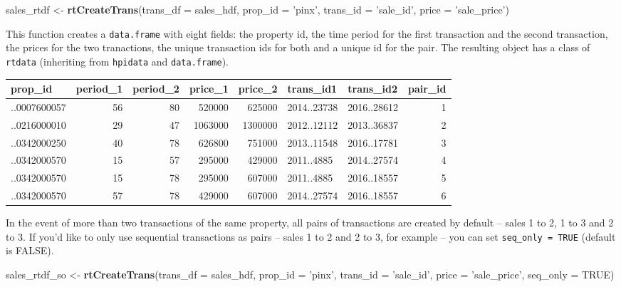 \documentclass[]{article}
\newenvironment{Shaded}{\begin{snugshade}}{\end{snugshade}}
\newcommand{\KeywordTok}[1]{\textcolor[rgb]{0.13,0.29,0.53}{\textbf{#1}}}
\newcommand{\DataTypeTok}[1]{\textcolor[rgb]{0.13,0.29,0.53}{#1}}
\newcommand{\StringTok}[1]{\textcolor[rgb]{0.31,0.60,0.02}{#1}}
\newcommand{\OtherTok}[1]{\textcolor[rgb]{0.56,0.35,0.01}{#1}}
\newcommand{\NormalTok}[1]{#1}
\begin{document}
\begin{Shaded}
\begin{Highlighting}[]
\NormalTok{  sales_rtdf <-}\StringTok{ }\KeywordTok{rtCreateTrans}\NormalTok{(}\DataTypeTok{trans_df =}\NormalTok{ sales_hdf,}
                              \DataTypeTok{prop_id =} \StringTok{'pinx'}\NormalTok{,}
                              \DataTypeTok{trans_id =} \StringTok{'sale_id'}\NormalTok{,}
                              \DataTypeTok{price =} \StringTok{'sale_price'}\NormalTok{)}
                          
\end{Highlighting}
\end{Shaded}

This function creates a \texttt{data.frame} with eight fields: the
property id, the time period for the first transaction and the second
transaction, the prices for the two tranactions, the unique transaction
ids for both and a unique id for the pair. The resulting object has a
class of \texttt{rtdata} (inheriting from \texttt{hpidata} and
\texttt{data.frame}).

\begin{longtable}[]{@{}lrrrrllr@{}}
\toprule
prop\_id & period\_1 & period\_2 & price\_1 & price\_2 & trans\_id1 &
trans\_id2 & pair\_id\tabularnewline
\midrule
\endhead
..0007600057 & 56 & 80 & 520000 & 625000 & 2014..23738 & 2016..28612 &
1\tabularnewline
..0216000010 & 29 & 47 & 1063000 & 1300000 & 2012..12112 & 2013..36837 &
2\tabularnewline
..0342000250 & 40 & 78 & 626800 & 751000 & 2013..11548 & 2016..17781 &
3\tabularnewline
..0342000570 & 15 & 57 & 295000 & 429000 & 2011..4885 & 2014..27574 &
4\tabularnewline
..0342000570 & 15 & 78 & 295000 & 607000 & 2011..4885 & 2016..18557 &
5\tabularnewline
..0342000570 & 57 & 78 & 429000 & 607000 & 2014..27574 & 2016..18557 &
6\tabularnewline
\bottomrule
\end{longtable}

In the event of more than two transactions of the same property, all
pairs of transactions are created by default -- sales 1 to 2, 1 to 3 and
2 to 3. If you'd like to only use sequential transactions as pairs --
sales 1 to 2 and 2 to 3, for example -- you can set
\texttt{seq\_only\ =\ TRUE} (default is FALSE).

\begin{Shaded}
\begin{Highlighting}[]
\NormalTok{  sales_rtdf_so <-}\StringTok{ }\KeywordTok{rtCreateTrans}\NormalTok{(}\DataTypeTok{trans_df =}\NormalTok{ sales_hdf,}
                                 \DataTypeTok{prop_id =} \StringTok{'pinx'}\NormalTok{,}
                                 \DataTypeTok{trans_id =} \StringTok{'sale_id'}\NormalTok{,}
                                 \DataTypeTok{price =} \StringTok{'sale_price'}\NormalTok{,}
                                 \DataTypeTok{seq_only =} \OtherTok{TRUE}\NormalTok{)}
\end{Highlighting}
\end{Shaded}
\end{document}
